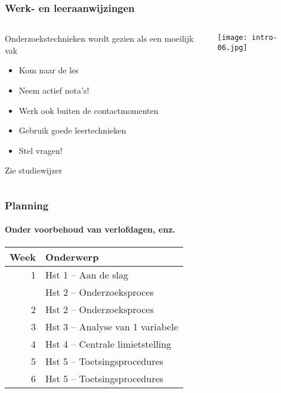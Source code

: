 \documentclass[aspectratio=169]{beamer}
\begin{document}
\begin{frame}
  \frametitle{Werk- en leeraanwijzingen}
  
  \begin{columns}
    \begin{column}{.8\textwidth}
        Onderzoekstechnieken wordt gezien als een moeilijk vak
      
      \begin{itemize}
        \item Kom naar de les
        \item Neem actief nota's!
        \item Werk ook buiten de contactmomenten
        \item Gebruik goede leertechnieken
        \item Stel vragen!
      \end{itemize}
      
      Zie studiewijzer
      
    \end{column}
  
    \begin{column}{.2\textwidth}
      \texttt{[image: intro-06.jpg]}
    \end{column}
  \end{columns}
  
\end{frame}

\begin{frame}
  \frametitle{Planning}
  \framesubtitle{Onder voorbehoud van verlofdagen, enz.}
  
  \centering
  \begin{tabular}{rl}
  	\toprule
  	\textbf{Week} & \textbf{Onderwerp}                \\
  	\midrule
  	            1 & Hst 1 -- Aan de slag              \\
  	              & Hst 2 -- Onderzoeksproces         \\
  	            2 & Hst 2 -- Onderzoeksproces         \\
  	            3 & Hst 3 -- Analyse van 1 variabele  \\
  	            4 & Hst 4 -- Centrale limietstelling  \\
  	            5 & Hst 5 -- Toetsingsprocedures      \\
  	            6 & Hst 5 -- Toetsingsprocedures      \\
  \end{tabular}
  
\end{frame}
\end{document}
